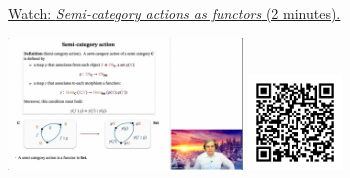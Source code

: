 
\begin{minipage}{10cm}
    \href{https://act4e-spring21.netlify.app/videos/spring2021-functors:semi-and-fun:ex-semicat-act-fun.html}{Watch: \emph{Semi-category actions as functors} (2 minutes).}
        
    \href{https://act4e-spring21.netlify.app/videos/spring2021-functors:semi-and-fun:ex-semicat-act-fun.html}{\includegraphics[height=3.5cm]{spring2021-functors:semi-and-fun:ex-semicat-act-fun/thumbnails.jpg}}
    \href{https://act4e-spring21.netlify.app/videos/spring2021-functors:semi-and-fun:ex-semicat-act-fun.html}{\includegraphics[height=2.5cm]{spring2021-functors:semi-and-fun:ex-semicat-act-fun/qrcode.png}}
\end{minipage}
